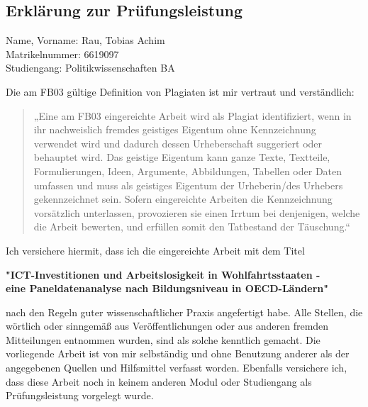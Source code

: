 \subsection{Erklärung zur Prüfungsleistung}

Name, Vorname: Rau, Tobias Achim \\
Matrikelnummer: 6619097 \\
Studiengang: Politikwissenschaften BA

\vspace{0.5cm}

Die am FB03 gültige Definition von Plagiaten ist mir vertraut und verständlich: 

\begin{quote}
    „Eine am FB03 eingereichte Arbeit wird als Plagiat identifiziert, wenn in ihr nachweislich 
    fremdes geistiges Eigentum ohne Kennzeichnung verwendet wird und dadurch dessen Urheberschaft 
    suggeriert oder behauptet wird. Das geistige Eigentum kann ganze Texte, Textteile, 
    Formulierungen, Ideen, Argumente, Abbildungen, Tabellen oder Daten umfassen und muss als 
    geistiges Eigentum der Urheberin/des Urhebers gekennzeichnet sein. Sofern eingereichte 
    Arbeiten die Kennzeichnung vorsätzlich unterlassen, provozieren sie einen Irrtum bei 
    denjenigen, welche die Arbeit bewerten, und erfüllen somit den Tatbestand der Täuschung.“
\end{quote}

Ich versichere hiermit, dass ich die eingereichte Arbeit mit dem Titel 

\begin{center}
    \textbf{"\ac{ICT}-Investitionen und Arbeitslosigkeit in Wohlfahrtsstaaten - \\ 
    eine Paneldatenanalyse nach Bildungsniveau in OECD-Ländern"} \\ 
\end{center}

nach den Regeln guter wissenschaftlicher Praxis angefertigt habe. Alle Stellen, die wörtlich oder 
sinngemäß aus Veröffentlichungen oder aus anderen fremden Mitteilungen entnommen wurden, sind als 
solche kenntlich gemacht. Die vorliegende Arbeit ist von mir selbständig und ohne Benutzung 
anderer als der angegebenen Quellen und Hilfsmittel verfasst worden. Ebenfalls versichere ich, 
dass diese Arbeit noch in keinem anderen Modul oder Studiengang als Prüfungsleistung vorgelegt 
wurde.

\vspace{0.5cm}

